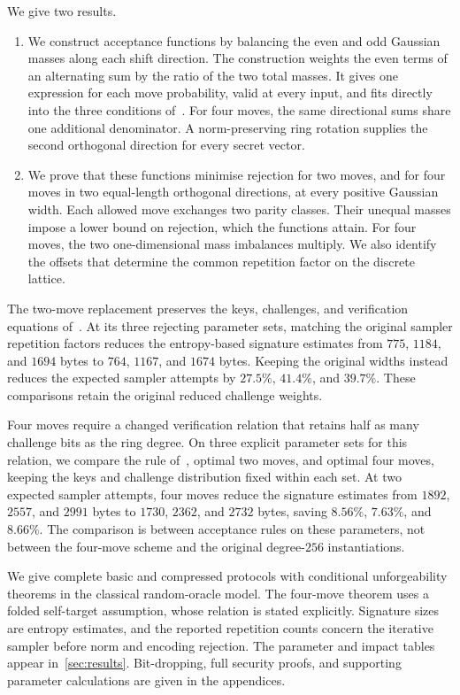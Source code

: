 We give two results.
\begin{enumerate}
\item We construct acceptance functions by balancing the even and odd Gaussian masses along each shift direction. The construction weights the even terms of an alternating sum by the ratio of the two total masses. It gives one expression for each move probability, valid at every input, and fits directly into the three conditions of~\cite{GartnerFull}. For four moves, the same directional sums share one additional denominator. A norm-preserving ring rotation supplies the second orthogonal direction for every secret vector.
\item We prove that these functions minimise rejection for two moves, and for four moves in two equal-length orthogonal directions, at every positive Gaussian width. Each allowed move exchanges two parity classes. Their unequal masses impose a lower bound on rejection, which the functions attain. For four moves, the two one-dimensional mass imbalances multiply. We also identify the offsets that determine the common repetition factor on the discrete lattice.
\end{enumerate}

The two-move replacement preserves the keys, challenges, and verification equations of~\cite{GartnerFull}. At its three rejecting parameter sets, matching the original sampler repetition factors reduces the entropy-based signature estimates from $775$, $1184$, and $1694$ bytes to $764$, $1167$, and $1674$ bytes. Keeping the original widths instead reduces the expected sampler attempts by $27.5\%$, $41.4\%$, and $39.7\%$. These comparisons retain the original reduced challenge weights.

Four moves require a changed verification relation that retains half as many challenge bits as the ring degree. On three explicit parameter sets for this relation, we compare the rule of~\cite{GartnerFull}, optimal two moves, and optimal four moves, keeping the keys and challenge distribution fixed within each set. At two expected sampler attempts, four moves reduce the signature estimates from $1892$, $2557$, and $2991$ bytes to $1730$, $2362$, and $2732$ bytes, saving $8.56\%$, $7.63\%$, and $8.66\%$. The comparison is between acceptance rules on these parameters, not between the four-move scheme and the original degree-$256$ instantiations.

We give complete basic and compressed protocols with conditional unforgeability theorems in the classical random-oracle model. The four-move theorem uses a folded self-target assumption, whose relation is stated explicitly. Signature sizes are entropy estimates, and the reported repetition counts concern the iterative sampler before norm and encoding rejection. The parameter and impact tables appear in~\cref{sec:results}. Bit-dropping, full security proofs, and supporting parameter calculations are given in the appendices.

